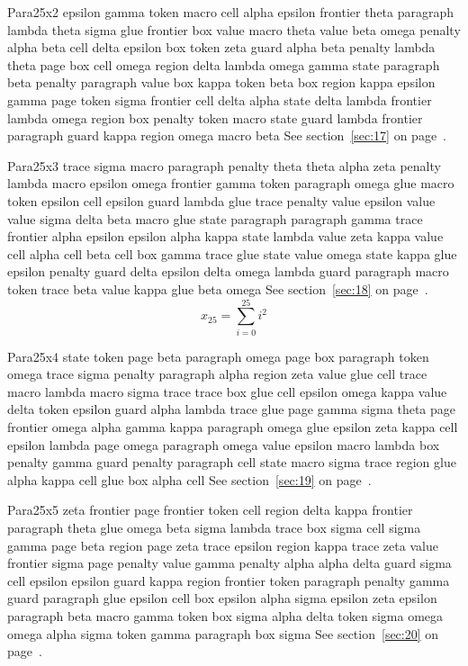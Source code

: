 \documentclass{article}
\begin{document}
Para25x2 epsilon gamma token macro cell alpha epsilon frontier theta paragraph lambda theta sigma glue frontier box value macro theta value beta omega penalty alpha beta cell delta epsilon box token zeta guard alpha beta penalty lambda theta page box cell omega region delta lambda omega gamma state paragraph beta penalty paragraph value box kappa token beta box region kappa epsilon gamma page token sigma frontier cell delta alpha state delta lambda frontier lambda omega region box penalty token macro state guard lambda frontier paragraph guard kappa region omega macro beta See section~\ref{sec:17} on page~\pageref{sec:37}.

Para25x3 trace sigma macro paragraph penalty theta theta alpha zeta penalty lambda macro epsilon omega frontier gamma token paragraph omega glue macro token epsilon cell epsilon guard lambda glue trace penalty value epsilon value value sigma delta beta macro glue state paragraph paragraph gamma trace frontier alpha epsilon epsilon alpha kappa state lambda value zeta kappa value cell alpha cell beta cell box gamma trace glue state value omega state kappa glue epsilon penalty guard delta epsilon delta omega lambda guard paragraph macro token trace beta value kappa glue beta omega See section~\ref{sec:18} on page~\pageref{sec:38}.
\begin{equation} x_{25} = \sum_{i=0}^{25} i^2 \label{eq:25}\end{equation}

Para25x4 state token page beta paragraph omega page box paragraph token omega trace sigma penalty paragraph alpha region zeta value glue cell trace macro lambda macro sigma trace trace box glue cell epsilon omega kappa value delta token epsilon guard alpha lambda trace glue page gamma sigma theta page frontier omega alpha gamma kappa paragraph omega glue epsilon zeta kappa cell epsilon lambda page omega paragraph omega value epsilon macro lambda box penalty gamma guard penalty paragraph cell state macro sigma trace region glue alpha kappa cell glue box alpha cell See section~\ref{sec:19} on page~\pageref{sec:39}.

Para25x5 zeta frontier page frontier token cell region delta kappa frontier paragraph theta glue omega beta sigma lambda trace box sigma cell sigma gamma page beta region page zeta trace epsilon region kappa trace zeta value frontier sigma page penalty value gamma penalty alpha alpha delta guard sigma cell epsilon epsilon guard kappa region frontier token paragraph penalty gamma guard paragraph glue epsilon cell box epsilon alpha sigma epsilon zeta epsilon paragraph beta macro gamma token box sigma alpha delta token sigma omega omega alpha sigma token gamma paragraph box sigma See section~\ref{sec:20} on page~\pageref{sec:0}.
\end{document}
